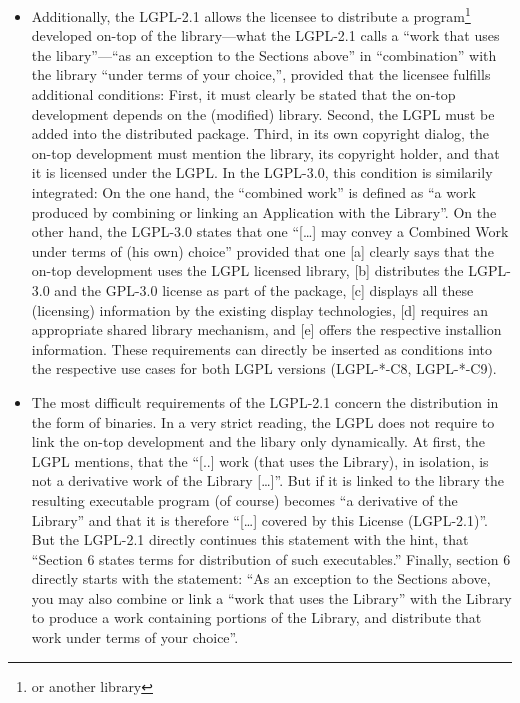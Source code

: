 \begin{itemize}
\item Additionally, the LGPL-2.1 allows the licensee to distribute a
  program\footnote{or another library} developed on-top of the library---what
  the LGPL-2.1 calls a \enquote{work that uses the libary}---\enquote{as an exception to the Sections above} in \enquote{combination}
  with the library \enquote{under terms of your choice,},
  provided that the licensee fulfills additional conditions:  
  First, it must clearly be stated that the on-top development depends on the
  (modified) library. Second, the LGPL must be added into the distributed
  package. Third, in its own copyright dialog, the on-top development must
  mention the library, its copyright holder, and that it is licensed under the
  LGPL. In the LGPL-3.0, this condition is similarily
  integrated: On the one hand, the \enquote{combined work} is defined as
  \enquote{a work produced by combining or linking an Application with the
  Library}. On the other hand, the LGPL-3.0 states that one
  \enquote{[\ldots] may convey a Combined Work under terms of (his own) choice}
  provided that one [a] clearly says that the on-top development uses the LGPL
  licensed library, [b] distributes the LGPL-3.0 and the GPL-3.0 license as part
  of the package, [c] displays all these (licensing) information by the existing
  display technologies, [d] requires an appropriate shared library mechanism,
  and [e] offers the respective installion information. These
  requirements can directly be inserted as conditions into the respective use
  cases for both LGPL versions (LGPL-*-C8, LGPL-*-C9).
  
\item The most difficult requirements of the LGPL-2.1 concern the distribution
  in the form of binaries. In a very strict reading, the LGPL does not require
  to link the on-top development and the libary only dynamically. At first, the
  LGPL mentions, that the \enquote{[..] work (that uses the Library), in
  isolation, is not a derivative work of the Library [\ldots]}. But if it is
  linked to the library the resulting executable program (of course) becomes
  \enquote{a derivative of the Library} and that it is therefore
  \enquote{[\ldots] covered by this License (LGPL-2.1)}. But the LGPL-2.1 
  directly continues this statement with the hint, that \enquote{Section 6
  states terms for distribution of such executables.} Finally,
  section 6 directly starts with the statement: \enquote{As an exception to the
  Sections above, you may also combine or link a ``work that uses the
  Library'' with the Library to produce a work containing portions of the
  Library, and distribute that work under terms of your choice}.
  

\end{itemize}
